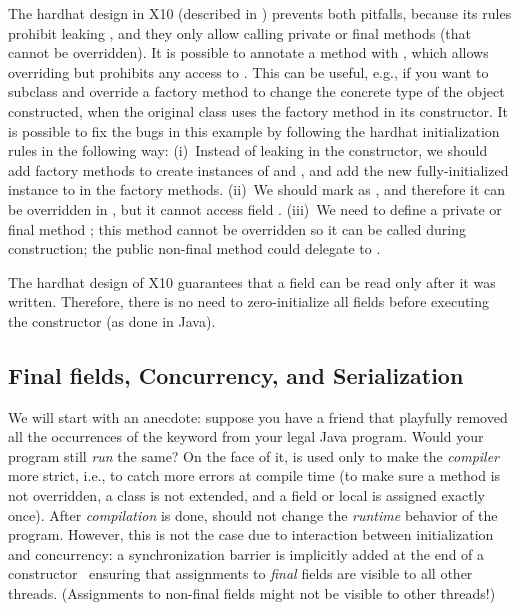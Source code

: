 The hardhat design in X10 (described in )
    prevents both pitfalls,
    because its rules prohibit leaking \this,
    and they only allow calling private or final methods (that cannot be overridden).
It is possible to annotate a method with ,
    which allows overriding but prohibits any access to \this.
This can be useful, e.g., if you want to subclass and override a factory method
    to change the concrete type of the object constructed,
    when the original class uses the factory method in its constructor.
It is possible to fix the bugs in this example by following the hardhat initialization rules
    in the following way:
    (i)~Instead of leaking \this in the constructor,
        we should add factory methods to create instances of  and ,
        and add the new fully-initialized instance to  in the factory methods.
    (ii)~We should mark  as ,
        and therefore it can be overridden in , but it cannot access field .
    (iii)~We need to define a private or final method ;
        this method cannot be overridden so it can be called during construction;
        the public non-final method  could delegate to .

The hardhat design of X10 guarantees that a field can be read only after it was written.
Therefore, there is no need to zero-initialize all fields before executing the constructor (as done in Java).


\subsection{Final fields, Concurrency, and Serialization}
\label{Section:FinalFields}
We will start with an anecdote:
    suppose you have a friend that
    playfully removed all the occurrences of the  keyword
    from your legal Java program.
Would your program still \emph{run} the same?
On the face of it,  is used only to make the \emph{compiler} more {strict},
    i.e., to catch more errors at compile time
    (to make sure a method is not overridden, a class is not extended, and a field or local
        is assigned exactly once).
After \emph{compilation} is done,  should not change the \emph{runtime} behavior of the program.
However, this is not the case due to interaction between initialization and concurrency:
    a synchronization barrier is implicitly added
    at the end of a constructor~\cite{JSR133}
    ensuring that assignments to \emph{final} fields are visible to all other threads.
(Assignments to non-final fields might not be visible to other threads!)

